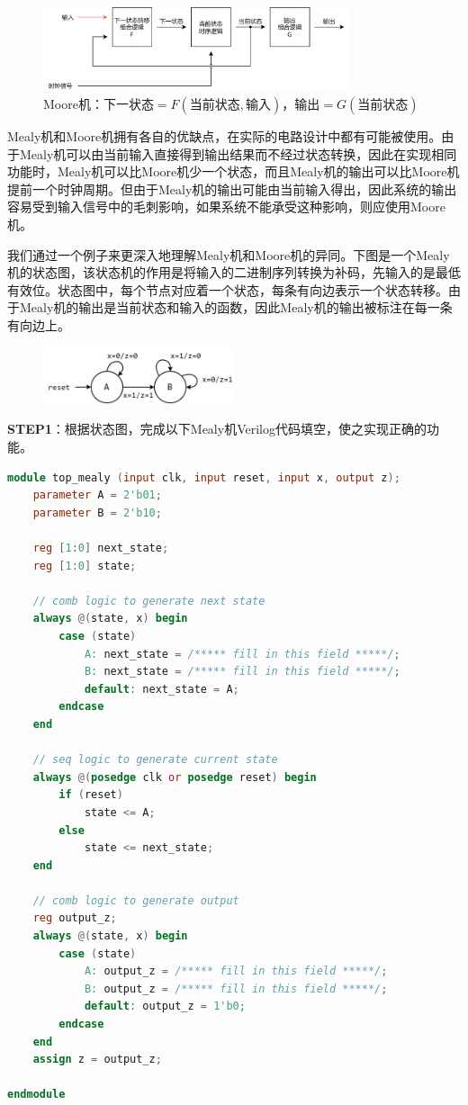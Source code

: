 \documentclass{ctexart}
\begin{document}
\begin{figure}[H]
    \centering
    \includegraphics[width=0.8\textwidth]{lab2/4.png}
    \caption{Moore机：$下一状态=F(当前状态,输入)$，$输出=G(当前状态)$}
\end{figure}

Mealy机和Moore机拥有各自的优缺点，在实际的电路设计中都有可能被使用。由于Mealy机可以由当前输入直接得到输出结果而不经过状态转换，因此在实现相同功能时，Mealy机可以比Moore机少一个状态，而且Mealy机的输出可以比Moore机提前一个时钟周期。但由于Mealy机的输出可能由当前输入得出，因此系统的输出容易受到输入信号中的毛刺影响，如果系统不能承受这种影响，则应使用Moore机。

我们通过一个例子来更深入地理解Mealy机和Moore机的异同。下图是一个Mealy机的状态图，该状态机的作用是将输入的二进制序列转换为补码，先输入的是最低有效位。状态图中，每个节点对应着一个状态，每条有向边表示一个状态转移。由于Mealy机的输出是当前状态和输入的函数，因此Mealy机的输出被标注在每一条有向边上。

\begin{figure}[H]
    \centering
    \includegraphics[width=0.5\textwidth]{lab2/5.png}
\end{figure}

\textbf{STEP1}：根据状态图，完成以下Mealy机Verilog代码填空，使之实现正确的功能。

\begin{lstlisting}[language=Verilog]
module top_mealy (input clk, input reset, input x, output z); 
    parameter A = 2'b01;
    parameter B = 2'b10;

    reg [1:0] next_state;
    reg [1:0] state;

    // comb logic to generate next state
    always @(state, x) begin
        case (state)
            A: next_state = /***** fill in this field *****/;
            B: next_state = /***** fill in this field *****/;
            default: next_state = A;
        endcase
    end

    // seq logic to generate current state
    always @(posedge clk or posedge reset) begin
        if (reset)
            state <= A;
        else
            state <= next_state;
    end

    // comb logic to generate output
    reg output_z;
    always @(state, x) begin
        case (state)
            A: output_z = /***** fill in this field *****/;
            B: output_z = /***** fill in this field *****/;
            default: output_z = 1'b0;
        endcase
    end
    assign z = output_z;

endmodule
\end{lstlisting}
\end{document}
